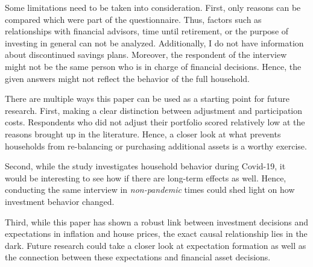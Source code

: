 \documentclass[ProjectABM]{subfiles}
\begin{document}
Some limitations need to be taken into consideration. First, only reasons can be compared which were part of the questionnaire. Thus, factors such as relationships with financial advisors, time until retirement, or the purpose of investing in general can not be analyzed. Additionally, I do not have information about discontinued savings plans. Moreover, the respondent of the interview might not be the same person who is in charge of financial decisions. Hence, the given answers might not reflect the behavior of the full household.



There are multiple ways this paper can be used as a starting point for future research. First, making a clear distinction between adjustment and participation costs. Respondents who did not adjust their portfolio scored relatively low at the reasons brought up in the literature. Hence, a closer look at what prevents households from re-balancing or purchasing additional assets is a worthy exercise. 

Second, while the study investigates household behavior during Covid-19, it would be interesting to see how if there are long-term effects as well. Hence, conducting the same interview in \textit{non-pandemic} times could shed light on how investment behavior changed.%

Third, while this paper has shown a robust link between investment decisions and expectations in inflation and house prices, the exact causal relationship lies in the dark. Future research could take a closer look at expectation formation as well as the connection between these expectations and financial asset decisions.
\end{document}
